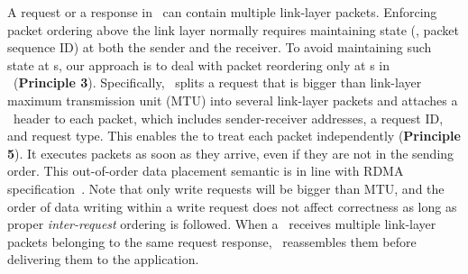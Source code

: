 


A request or a response in \sys\ can contain multiple link-layer packets. 
Enforcing packet ordering above the link layer normally requires maintaining state (\eg, packet sequence ID) at both the sender and the receiver.
To avoid maintaining such state at \MN{}s,
our approach is to deal with packet reordering only at \CN{}s in \syslib\ (\textbf{Principle 3}).
Specifically, \syslib\ splits a request that is bigger than link-layer maximum transmission unit (MTU) into several link-layer packets
and attaches a \sys\ header to each packet, which includes sender-receiver addresses, a request ID, and request type.
This enables the \MN{} to treat each packet independently (\textbf{Principle 5}).
It executes packets as soon as they arrive, even if they are not in the sending order.
This out-of-order data placement semantic is in line with RDMA specification~\cite{IRN}. 
Note that only write requests will be bigger than MTU, and the order of data writing within a write request does not affect correctness as long as proper {\em inter-request} ordering is followed.
When a \CN\ receives multiple link-layer packets belonging to the same request response, 
\syslib\ reassembles them before delivering them to the application.


